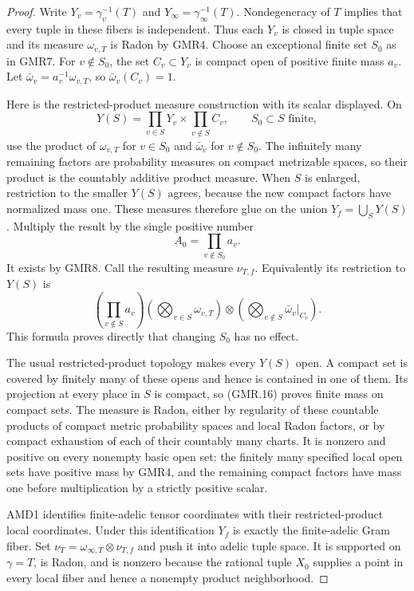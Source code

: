 \documentclass[11pt,a4paper]{article}
\numberwithin{equation}{section}
\theoremstyle{remark}\newtheorem{remark}[theorem]{Remark}
\begin{document}
\begin{proof}
Write $Y_v=\gamma_v^{-1}(T)$ and $Y_\infty=\gamma_\infty^{-1}(T)$.
Nondegeneracy of $T$ implies that every tuple in these fibers is
independent.  Thus each $Y_v$ is closed in tuple space and its measure
$\omega_{v,T}$ is Radon by GMR4.  Choose an exceptional finite set
$S_0$ as in GMR7.  For $v\notin S_0$, the set $C_v\subset Y_v$ is
compact open of positive finite mass $a_v$.  Let
$\bar\omega_v=a_v^{-1}\omega_{v,T}$, so
$\bar\omega_v(C_v)=1$.

Here is the restricted-product measure construction with its scalar
displayed.  On
\[
 Y(S)=\prod_{v\in S}Y_v\times\prod_{v\notin S}C_v,
       \qquad S_0\subset S\text{ finite},
\]
use the product of $\omega_{v,T}$ for $v\in S_0$ and
$\bar\omega_v$ for $v\notin S_0$.  The infinitely many remaining
factors are probability measures on compact metrizable spaces, so
their product is the countably additive product measure.  When $S$
is enlarged, restriction to the smaller $Y(S)$ agrees, because the
new compact factors have normalized mass one.  These measures
therefore glue on the union $Y_f=\bigcup_SY(S)$.  Multiply the result
by the single positive number
\[
 A_0=\prod_{v\notin S_0}a_v.
 \tag{GMR.15}
\]
It exists by GMR8.  Call the resulting measure $\nu_{T,f}$.
Equivalently its restriction to $Y(S)$ is
\[
 \left(\prod_{v\notin S}a_v\right)
 \left(\bigotimes_{v\in S}\omega_{v,T}\right)
 \otimes\left(\bigotimes_{v\notin S}\bar\omega_v|_{C_v}\right).
 \tag{GMR.16}
\]
This formula proves directly that changing $S_0$ has no effect.

The usual restricted-product topology makes every $Y(S)$ open.
A compact set is covered by finitely many of these opens and hence
is contained in one of them.  Its projection at every place in $S$
is compact, so (GMR.16) proves finite mass on compact sets.  The
measure is Radon, either by regularity of these countable products
of compact metric probability spaces and local Radon factors, or by
compact exhaustion of each of their countably many charts.
It is nonzero and positive on every nonempty basic open set: the
finitely many specified local open sets have positive mass by GMR4,
and the remaining compact factors have mass one before multiplication
by a strictly positive scalar.

AMD1 identifies finite-adelic tensor coordinates with their
restricted-product local coordinates.  Under this identification
$Y_f$ is exactly the finite-adelic Gram fiber.  Set
$\nu_T=\omega_{\infty,T}\otimes\nu_{T,f}$ and push it into adelic
tuple space.  It is supported on $\gamma=T$, is Radon, and is nonzero
because the rational tuple $X_0$ supplies a point in every local
fiber and hence a nonempty product neighborhood.


\end{proof}
\end{document}
